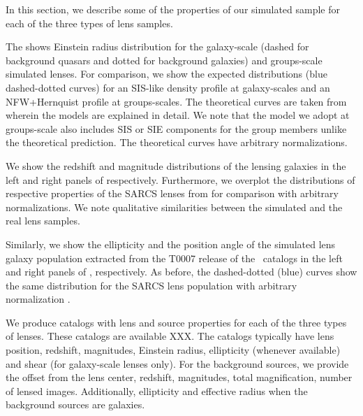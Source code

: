\documentclass[useAMS,usenatbib,a4paper]{mn2e}
\begin{document}
In this section, we describe some of the properties of our simulated sample for
each of the three types of lens samples.

The  shows Einstein radius distribution for the
galaxy-scale (dashed for background quasars and dotted for background galaxies)
and groups-scale simulated lenses. For comparison, we show the expected
distributions (blue dashed-dotted curves) for an SIS-like density profile at
galaxy-scales and an NFW+Hernquist profile at groups-scales. The 
theoretical curves are taken from \citep{More2012} wherein the models are
explained in detail. We note that the model we adopt at groups-scale also
includes SIS or SIE components for the group members unlike the theoretical
prediction. The theoretical curves have arbitrary normalizations.

We show the redshift and magnitude distributions of the lensing galaxies in the
left and right panels of 
respectively. Furthermore, we overplot the distributions of respective
properties of the SARCS lenses from \citep{More2012} for comparison with arbitrary
normalizations. We note qualitative similarities between the simulated and the
real lens samples.

Similarly, we show the ellipticity and the position angle of the simulated lens
galaxy population extracted from the T0007 release of the \cfhtls~catalogs in the
left and right panels of , respectively. As before, the
dashed-dotted (blue) curves show the same distribution for the SARCS lens
population with arbitrary normalization \citep{More2012}.


We produce catalogs with lens and source properties for each of the three types
of lenses. These catalogs are available XXX. The catalogs typically have lens
position, redshift, magnitudes, Einstein radius, ellipticity (whenever
available) and shear (for galaxy-scale lenses only). For the background
sources, we provide the offset from the lens center, redshift, magnitudes,
total magnification, number of lensed images. Additionally, ellipticity and
effective radius when the background sources are galaxies.
\end{document}

